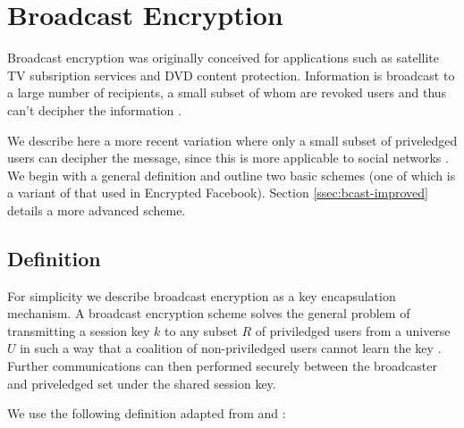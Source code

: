 \chapter{Broadcast Encryption}
\label{app:bcast}


Broadcast encryption was originally conceived for applications such as satellite TV subsription services and DVD content protection. Information is broadcast to a large number of recipients, a small subset of whom are revoked users and thus can't decipher the information \cite{fiat-naor}.

We describe here a more recent variation where only a small subset of priveledged users can decipher the message, since this is more applicable to social networks \cite{survey}. We begin with a general definition and outline two basic schemes (one of which is a variant of that used in Encrypted Facebook). Section \ref{ssec:bcast-improved} details a more advanced scheme.


\section{Definition}

For simplicity we describe broadcast encryption as a key encapsulation mechanism. A broadcast encryption scheme solves the general problem of transmitting a session key $k$ to any subset $R$ of priviledged users from a universe $U$ in such a way that a coalition of non-priviledged users cannot learn the key \cite{fiat-naor}. Further communications can then performed securely between the broadcaster and priveledged set under the shared session key.

We use the following definition adapted from \cite{fiat-naor} and \cite{boneh}:

